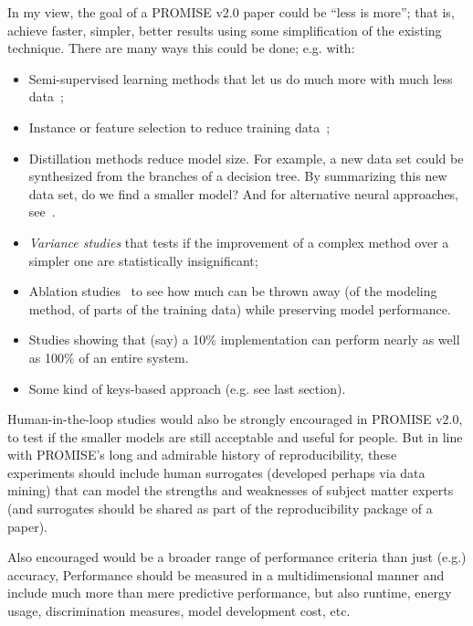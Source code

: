 \documentclass[sigconf,screen]{acmart}
\begin{document}
In my view, the goal of a PROMISE v2.0 paper could be ``less is more''; that is, achieve faster, simpler,
better results using some simplification of the existing technique. There are many ways this could be done; e.g. with:
\begin{itemize}
\item Semi-supervised learning methods that let us do much more with much less data~\cite{tu2021frugal,zhu2005semi};
\item Instance or feature selection  to reduce   training data~\cite{olvera2010review,Kohavi97};
\item Distillation methods   reduce model size. For example, a new data set could be synthesized from the branches of a decision tree. By summarizing this new data set, do we find a smaller model? And for alternative neural approaches, 
see~\cite{Shi23,Biswas23}.
\item  {\em Variance studies}
that tests if the improvement of a complex method over a simpler one are   statistically insignificant;
\item Ablation studies~\cite{yedida2023find} to see how
much can be thrown away (of the modeling method, of parts of the training data) while preserving model performance.
\item Studies showing that (say) a 10\% implementation can perform nearly as well as 100\% of an entire system.
\item Some kind of keys-based approach (e.g. see last section).
\end{itemize} 
Human-in-the-loop studies would also be strongly encouraged
in PROMISE v2.0, to test if the smaller models are still acceptable and useful for people. But in line with PROMISE's long
and admirable history of reproducibility, these experiments should
include human surrogates (developed perhaps via data mining)
that can model the strengths and weaknesses of subject matter
experts (and surrogates should be shared as part of the reproducibility package of a paper).

Also encouraged would be a broader range of performance criteria than just (e.g.) accuracy,
Performance should be measured in a multidimensional
manner and include much more than mere predictive performance,
but also runtime, energy usage, discrimination measures, model development cost, etc.
\end{document}
